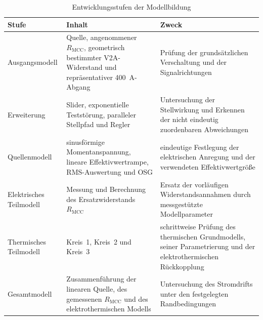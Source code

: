 \begin{table}[H]
    \centering
    \caption{Entwicklungsstufen der Modellbildung}
    \label{tab:modellstufen_kap5}
    \begin{tabularx}{\textwidth}{@{}p{}p{}X@{}}
        \toprule
        Stufe & Inhalt & Zweck \\
        \midrule
        Ausgangsmodell &
        Quelle, angenommener \(R_\mathrm{MCC}\), geometrisch bestimmter
        V2A-Widerstand und repräsentativer \SI{400}{\ampere}-Abgang &
        Prüfung der grundsätzlichen Verschaltung und der Signalrichtungen \\

        Erweiterung &
        Slider, exponentielle Teststörung, paralleler Stellpfad und Regler &
        Untersuchung der Stellwirkung und Erkennen der nicht eindeutig
        zuordenbaren Abweichungen \\

        Quellenmodell &
        sinusförmige Momentanspannung, lineare Effektivwertrampe,
        RMS-Auswertung und OSG &
        eindeutige Festlegung der elektrischen Anregung und der verwendeten
        Effektivwertgröße \\

        Elektrisches Teilmodell &
        Messung und Berechnung des Ersatzwiderstands
        \(R_\mathrm{MCC}\) &
        Ersatz der vorläufigen Widerstandsannahmen durch messgestützte
        Modellparameter \\

        Thermisches Teilmodell &
        Kreis~1, Kreis~2 und Kreis~3 &
        schrittweise Prüfung des thermischen Grundmodells, seiner
        Parametrierung und der elektrothermischen Rückkopplung \\

        Gesamtmodell &
        Zusammenführung der linearen Quelle, des gemessenen
        \(R_\mathrm{MCC}\) und des elektrothermischen Modells &
        Untersuchung des Stromdrifts unter den festgelegten Randbedingungen \\
        \bottomrule
    \end{tabularx}
\end{table}


